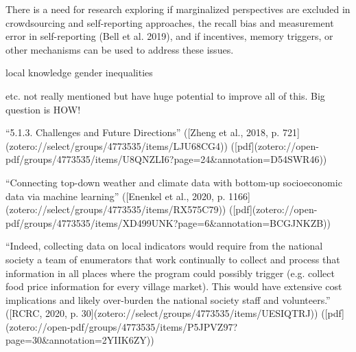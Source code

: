 There is a need for research exploring if marginalized perspectives are excluded in crowdsourcing and self-reporting approaches, the recall bias and measurement error in self-reporting (Bell et al. 2019), and if incentives, memory triggers, or other mechanisms can be used to address these issues.


local knowledge
gender inequalities

etc. not really mentioned but have huge potential to improve all of this. Big question is HOW!

“5.1.3. Challenges and Future Directions” ([Zheng et al., 2018, p. 721](zotero://select/groups/4773535/items/LJU68CG4)) ([pdf](zotero://open-pdf/groups/4773535/items/U8QNZLI6?page=24&annotation=D54SWR46))

“Connecting top-down weather and climate data with bottom-up socioeconomic data via machine learning” ([Enenkel et al., 2020, p. 1166](zotero://select/groups/4773535/items/RX575C79)) ([pdf](zotero://open-pdf/groups/4773535/items/XD499UNK?page=6&annotation=BCGJNKZB))


“Indeed, collecting data on local indicators would require from the national society a team of enumerators that work continually to collect and process that information in all places where the program could possibly trigger (e.g. collect food price information for every village market). This would have extensive cost implications and likely over-burden the national society staff and volunteers.” ([RCRC, 2020, p. 30](zotero://select/groups/4773535/items/UESIQTRJ)) ([pdf](zotero://open-pdf/groups/4773535/items/P5JPVZ97?page=30&annotation=2YIIK6ZY))

